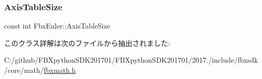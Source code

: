 \mbox{\label{class_fbx_euler_aa7c81e68be87ae5c26810eba96ede9ba}} 
\subsubsection{\texorpdfstring{Axis\+Table\+Size}{AxisTableSize}}
{\footnotesize\ttfamily const int Fbx\+Euler\+::\+Axis\+Table\+Size\hspace{0.3cm}{\ttfamily [static]}}



このクラス詳解は次のファイルから抽出されました\+:\begin{DoxyCompactItemize}
\item 
C\+:/github/\+F\+B\+Xpython\+S\+D\+K201701/\+F\+B\+Xpython\+S\+D\+K201701/2017./include/fbxsdk/core/math/\hyperlink{fbxmath_8h}{fbxmath.\+h}\end{DoxyCompactItemize}
